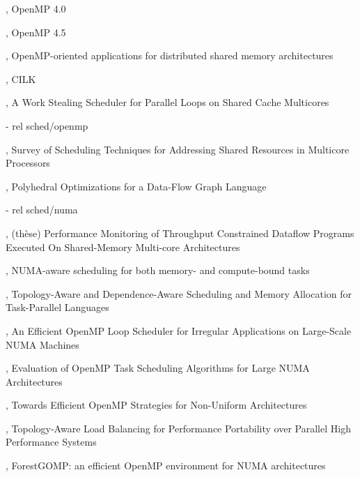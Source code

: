 




\cite{openmp40}, OpenMP 4.0

\cite{openmp45}, OpenMP 4.5

\cite{Marowka2004}, OpenMP-oriented applications for distributed shared memory architectures

\cite{cilk5}, CILK

\cite{Tchiboukdjian2010}, A Work Stealing Scheduler for Parallel Loops on Shared Cache Multicores



  - rel sched/openmp

\cite{Zhuravlev2012}, Survey of Scheduling Techniques for Addressing Shared Resources in Multicore Processors

\cite{Sbirlea2015}, Polyhedral Optimizations for a Data-Flow Graph Language

  - rel sched/numa

\cite{Selva2015}, (thèse) Performance Monitoring of Throughput Constrained Dataflow Programs Executed On Shared-Memory Multi-core Architectures

\cite{Reinman2015}, NUMA-aware scheduling for both memory- and compute-bound tasks

\cite{Drebes2014}, Topology-Aware and Dependence-Aware Scheduling and Memory Allocation for Task-Parallel Languages

\cite{Durand2013}, An Efficient OpenMP Loop Scheduler for Irregular Applications on Large-Scale NUMA Machines

\cite{Clet2014}, Evaluation of OpenMP Task Scheduling Algorithms for Large NUMA Architectures

\cite{Tahan2014}, Towards Efficient OpenMP Strategies for Non-Uniform Architectures

\cite{Pilla2014}, Topology-Aware Load Balancing for Performance Portability over Parallel High Performance Systems

\cite{Broquedis2010a}, ForestGOMP: an efficient OpenMP environment for NUMA architectures

